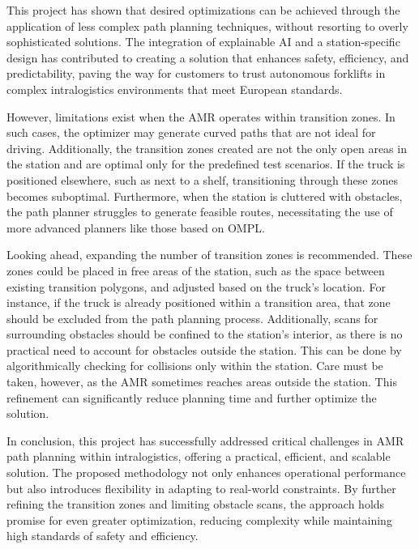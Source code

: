 This project has shown that desired optimizations can be achieved through the application of less complex 
path planning techniques, without resorting to overly sophisticated solutions. The integration of explainable 
AI and a station-specific design has contributed to creating a solution that enhances safety, efficiency, 
and predictability, paving the way for customers to trust autonomous forklifts in complex intralogistics 
environments that meet European standards.

However, limitations exist when the AMR operates within transition zones. In such cases, the optimizer may 
generate curved paths that are not ideal for driving. Additionally, the transition zones created are not 
the only open areas in the station and are optimal only for the predefined test scenarios. If the truck 
is positioned elsewhere, such as next to a shelf, transitioning through these zones becomes suboptimal. 
Furthermore, when the station is cluttered with obstacles, the path planner struggles to generate feasible 
routes, necessitating the use of more advanced planners like those based on OMPL.

Looking ahead, expanding the number of transition zones is recommended. These zones could be placed in 
free areas of the station, such as the space between existing transition polygons, and adjusted based on 
the truck's location. For instance, if the truck is already positioned within a transition area, that 
zone should be excluded from the path planning process. Additionally, scans for surrounding obstacles 
should be confined to the station's interior, as there is no practical need to account for obstacles 
outside the station. This can be done by algorithmically checking for collisions only within the station. 
Care must be taken, however, as the AMR sometimes reaches areas outside the station. This refinement 
can significantly reduce planning time and further optimize the solution.

In conclusion, this project has successfully addressed critical challenges in AMR path planning within 
intralogistics, offering a practical, efficient, and scalable solution. The proposed methodology not 
only enhances operational performance but also introduces flexibility in adapting to real-world constraints. 
By further refining the transition zones and limiting obstacle scans, the approach holds promise for 
even greater optimization, reducing complexity while maintaining high standards of safety and efficiency.





